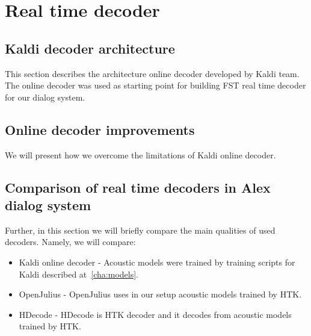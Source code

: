 \chapter{Real time decoder}
\label{cha:real_time_decoder}



\section{Kaldi decoder architecture} 
\label{sec:kaldi_decoder_architecture}
This section describes the architecture online decoder developed by Kaldi team.
The online decoder was used as starting point for building FST real time decoder for our dialog system.


\section{Online decoder improvements} 
\label{sec:online_decoder_improvements}
We will present how we overcome the limitations of Kaldi online decoder.



\section{Comparison of real time decoders in Alex dialog system} 
\label{sec:comparison_of_real_time_decoders_in_alex_dialog_system}
Further, in this section we will briefly compare the main qualities of used decoders.
Namely, we will compare: 
\begin{itemize}
    \item Kaldi online decoder - Acoustic models were trained by training scripts for Kaldi described at~\ref{cha:models}.
    \item OpenJulius - OpenJulius uses in our setup acoustic models trained by HTK. 
    \item HDecode - HDecode is HTK decoder and it decodes from acoustic models trained by HTK.
\end{itemize}



